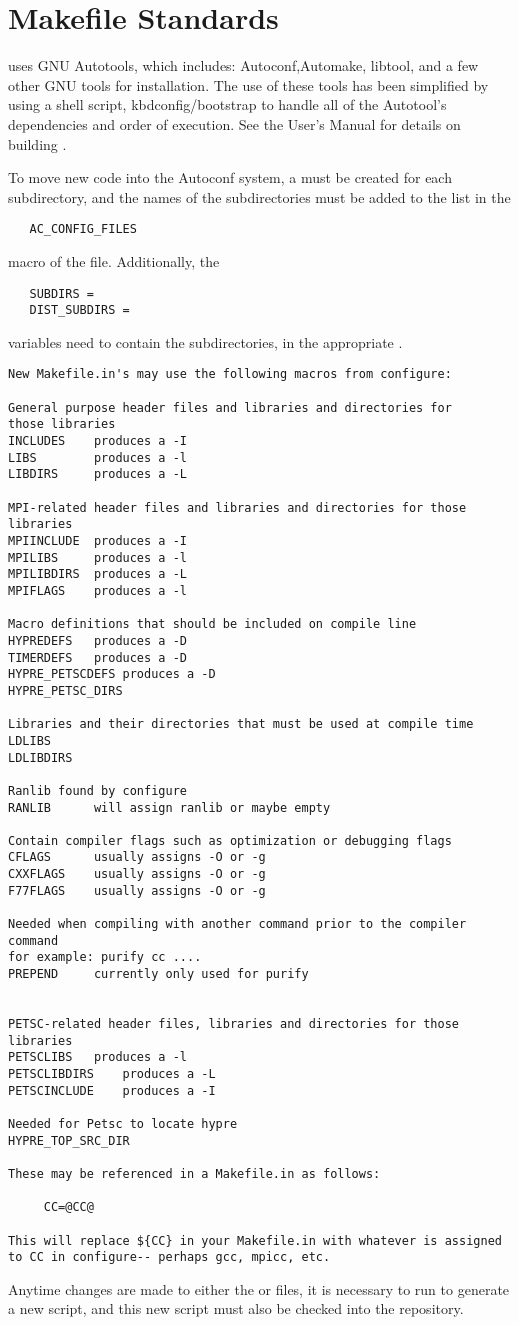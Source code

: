 \chapter{Makefile Standards}
\label{Makefile Standards}

\hypre{} uses GNU Autotools, which includes: Autoconf,Automake, libtool, 
and a few other GNU tools for installation.  The use of these tools 
has been simplified by using a shell script, kbd{config/bootstrap}  to 
handle all of the Autotool's dependencies and order of execution.
See the User's Manual for details on building \hypre{}.

To move new code into the Autoconf system, a  must be
created for each subdirectory, and the names of the
subdirectories must be added to the list in the
\begin{verbatim}
   AC_CONFIG_FILES
\end{verbatim}
macro of the  file.
Additionally, the 
\begin{verbatim}
   SUBDIRS =
   DIST_SUBDIRS =
\end{verbatim}
variables need to contain the subdirectories, in the appropriate
.
\begin{verbatim}
New Makefile.in's may use the following macros from configure:

General purpose header files and libraries and directories for
those libraries 
INCLUDES  	produces a -I
LIBS		produces a -l
LIBDIRS		produces a -L

MPI-related header files and libraries and directories for those libraries
MPIINCLUDE	produces a -I
MPILIBS		produces a -l
MPILIBDIRS	produces a -L
MPIFLAGS	produces a -l

Macro definitions that should be included on compile line
HYPREDEFS	produces a -D
TIMERDEFS	produces a -D
HYPRE_PETSCDEFS produces a -D
HYPRE_PETSC_DIRS 

Libraries and their directories that must be used at compile time 
LDLIBS
LDLIBDIRS

Ranlib found by configure
RANLIB		will assign ranlib or maybe empty

Contain compiler flags such as optimization or debugging flags
CFLAGS		usually assigns -O or -g
CXXFLAGS	usually assigns -O or -g
F77FLAGS	usually assigns -O or -g

Needed when compiling with another command prior to the compiler command
for example: purify cc ....
PREPEND 	currently only used for purify


PETSC-related header files, libraries and directories for those libraries
PETSCLIBS	produces a -l
PETSCLIBDIRS	produces a -L
PETSCINCLUDE 	produces a -I

Needed for Petsc to locate hypre
HYPRE_TOP_SRC_DIR 

These may be referenced in a Makefile.in as follows:
  
	 CC=@CC@

This will replace ${CC} in your Makefile.in with whatever is assigned
to CC in configure-- perhaps gcc, mpicc, etc.

\end{verbatim}

Anytime changes are made to either the  or
 files, it is necessary to run  to
generate a new  script, and this new script must also
be checked into the repository.


